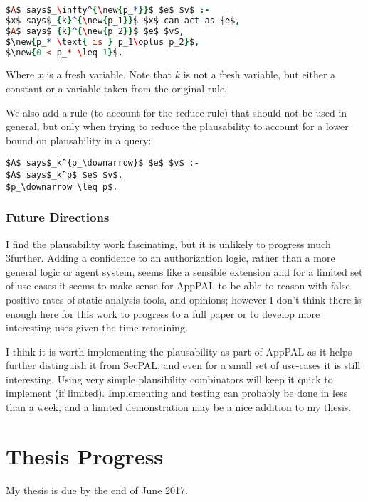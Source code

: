 \documentclass[a4paper]{scrartcl}
\newcommand{\new}[1]{{\color{BrickRed}#1}}
\begin{document}
\begin{enumerate}
  \begin{lstlisting}[language=Prolog]
$A$ says$_\infty^{\new{p_*}}$ $e$ $v$ :-
$x$ says$_{k}^{\new{p_1}}$ $x$ can-act-as $e$,
$A$ says$_{k}^{\new{p_2}}$ $e$ $v$,
$\new{p_* \text{ is } p_1\oplus p_2}$,
$\new{0 < p_* \leq 1}$.
  \end{lstlisting}
  Where $x$ is a fresh variable.  Note that $k$ is not a fresh variable, but either a constant or a variable taken from the original rule.


  \new{
    We also add a rule (to account for the reduce rule)
    that should not be used in general, but only when trying to reduce the
    plausability to account for a lower bound on plausability in a query:
  }

  \begin{lstlisting}[basicstyle=\color{BrickRed}\ttfamily]
$A$ says$_k^{p_\downarrow}$ $e$ $v$ :-
$A$ says$_k^p$ $e$ $v$,
$p_\downarrow \leq p$.
  \end{lstlisting}
\end{enumerate}

\subsubsection*{Future Directions}

I find the plausability work fascinating, but it is unlikely to progress much
3further.  Adding a confidence to an authorization logic, rather than a more
general logic or agent system, seems like a sensible extension and for a limited
set of use cases it seems to make sense for AppPAL to be able to reason with false
positive rates of static analysis tools, and opinions; however I don't think
there is enough here for this work to progress to a full paper or to develop
more interesting uses given the time remaining.

I think it is worth implementing the plausability as part of AppPAL as it helps
further distinguish it from SecPAL, and even for a small set of use-cases it is
still interesting.  Using very simple plausibility combinators will keep it
quick to implement (if limited).  Implementing and testing can probably be done
in less than a week, and a limited demonstration may be a nice addition to my thesis.

\section{Thesis Progress}
\label{sec:thesis}

My thesis is due by the end of June 2017.
\end{document}
